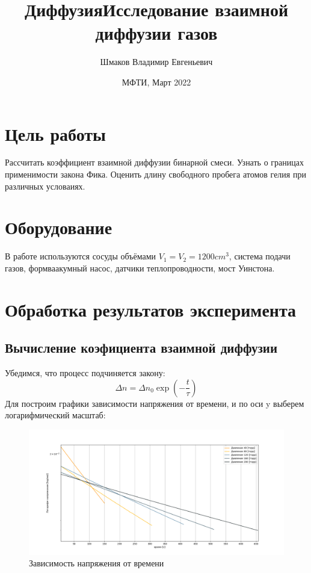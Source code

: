 \documentclass{article}
\title{Диффузия}
\author{Шмаков Владимир Евгеньевич}
\date{МФТИ, Март 2022}
\title{Исследование взаимной диффузии газов}
\begin{document}
	
\maketitle
\newpage
\section{Цель работы}
Рассчитать коэффициент взаимной диффузии бинарной смеси. Узнать о границах применимости закона Фика. Оценить длину свободного пробега атомов гелия при различных условаиях.
\section{Оборудование}
В работе используются сосуды объёмами $V_1=V_2=1200 cm^3$, система подачи газов, формваакумный насос, датчики теплопроводности, мост Уинстона.
\section{Обработка результатов эксперимента}
\subsection{Вычисление коэфициента взаимной диффузии}
Убедимся, что процесс подчиняется закону: \[\Delta{n} = \Delta{n_0}\exp\left(-\frac{t}{\tau}\right) \]
Для построим графики зависимости напряжения от времени, и по оси y выберем логарифмический масштаб:
\begin{figure}[h]
    \centering
    \includegraphics[scale = 0.3]{log(u)byT.png}
    \caption{Зависимость напряжения от времени}
    \label{fig:my_label}
\end{figure}
\end{document}
